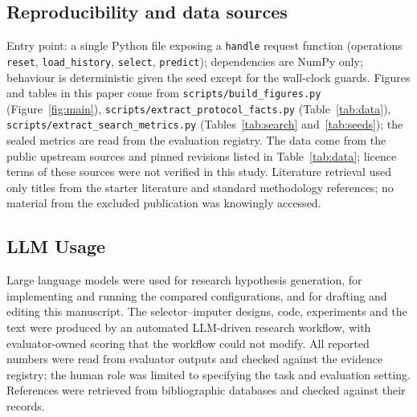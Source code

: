\documentclass{article}
\begin{document}
\subsection{Reproducibility and data sources}
Entry point: a single Python file exposing a \texttt{handle} request function (operations \texttt{reset}, \texttt{load\_history}, \texttt{select}, \texttt{predict}); dependencies are NumPy only; behaviour is deterministic given the seed except for the wall-clock guards. Figures and tables in this paper come from \texttt{scripts/build\_figures.py} (Figure~\ref{fig:main}), \texttt{scripts/extract\_protocol\_facts.py} (Table~\ref{tab:data}), \texttt{scripts/extract\_search\_metrics.py} (Tables~\ref{tab:search} and~\ref{tab:seeds}); the sealed metrics are read from the evaluation registry. The data come from the public upstream sources and pinned revisions listed in Table~\ref{tab:data}; licence terms of these sources were not verified in this study. Literature retrieval used only titles from the starter literature and standard methodology references; no material from the excluded publication was knowingly accessed.

\subsection{LLM Usage}
Large language models were used for research hypothesis generation, for implementing and running the compared configurations, and for drafting and editing this manuscript. The selector--imputer designs, code, experiments and the text were produced by an automated LLM-driven research workflow, with evaluator-owned scoring that the workflow could not modify. All reported numbers were read from evaluator outputs and checked against the evidence registry; the human role was limited to specifying the task and evaluation setting. References were retrieved from bibliographic databases and checked against their records.
\end{document}
